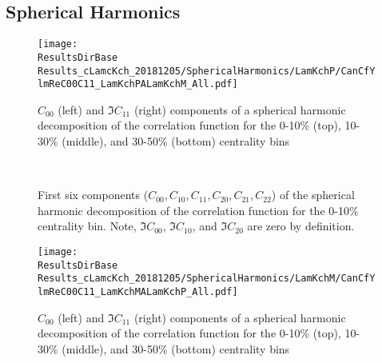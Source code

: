 \documentclass[/home/jesse/Analysis/FemtoAnalysis/AnalysisNotes/AnalysisNoteJBuxton.tex]{subfiles}
\begin{document}
\subsection{Spherical Harmonics}
\label{AdditionalFigures_SphericalHarmonics}



\begin{figure}[h]
  \centering
  \texttt{[image: \\ResultsDirBase Results\_cLamcKch\_20181205/SphericalHarmonics/LamKchP/CanCfYlmReC00C11\_LamKchPALamKchM\_All.pdf]}
  \caption[\LamKchP $C_{00}$ and $\Im C_{11}$ Spherical Harmonic Components]{$C_{00}$ (left) and $\Im C_{11}$ (right) components of a spherical harmonic decomposition of the \LamKchP correlation function for the 0-10\% (top), 10-30\% (middle), and 30-50\% (bottom) centrality bins}
  \label{fig:LamKchP_ReC00C11_All}
\end{figure}



\begin{figure}[h!]
  \centering
   \\
  \caption[\LamKchP First Six Components of Spherical Harmonic Decomposition (0-10\%)]{First six components ($C_{00}, C_{10}, C_{11}, C_{20}, C_{21}, C_{22}$) of the spherical harmonic decomposition of the \LamKchP correlation function for the 0-10\% centrality bin.
  Note, $\Im C_{00}$, $\Im C_{10}$, and $\Im C_{20}$ are zero by definition.}
  \label{fig:LamKchP_FirstSixCYlm}
\end{figure}











\begin{figure}[h]
  \centering
  \texttt{[image: \\ResultsDirBase Results\_cLamcKch\_20181205/SphericalHarmonics/LamKchM/CanCfYlmReC00C11\_LamKchMALamKchP\_All.pdf]}
  \caption[\LamKchM $C_{00}$ and $\Im C_{11}$ Spherical Harmonic Components]{$C_{00}$ (left) and $\Im C_{11}$ (right) components of a spherical harmonic decomposition of the \LamKchM correlation function for the 0-10\% (top), 10-30\% (middle), and 30-50\% (bottom) centrality bins}
  \label{fig:LamKchM_ReC00C11_All}
\end{figure}
\end{document}
